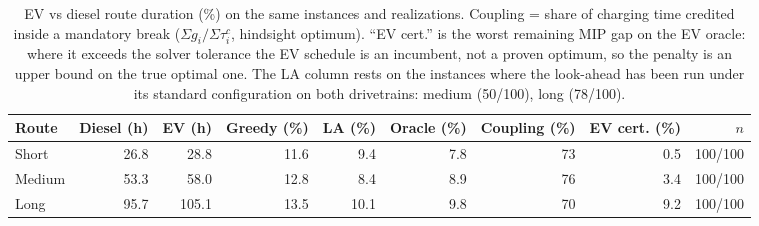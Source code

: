 \begin{table}[ht]\centering
\caption{EV vs diesel route duration (\%) on the same instances and realizations.  Coupling = share of charging time credited inside a mandatory break ($\Sigma g_i/\Sigma\tau^c_i$, hindsight optimum). ``EV cert.'' is the worst remaining MIP gap on the EV oracle: where it exceeds the solver tolerance the EV schedule is an incumbent, not a proven optimum, so the penalty is an upper bound on the true optimal one.  The LA column rests on the instances where the look-ahead has been run under its standard configuration on both drivetrains: medium (50/100), long (78/100).}
\label{tab:diesel}
\begin{tabular}{lrrrrrrrr}
\hline
Route & Diesel (h) & EV (h) & Greedy (\%) & LA (\%) & Oracle (\%) & Coupling (\%) & EV cert. (\%) & $n$ \\
\hline
Short & 26.8 & 28.8 & 11.6 & 9.4 & 7.8 & 73 & 0.5 & 100/100 \\
Medium & 53.3 & 58.0 & 12.8 & 8.4 & 8.9 & 76 & 3.4 & 100/100 \\
Long & 95.7 & 105.1 & 13.5 & 10.1 & 9.8 & 70 & 9.2 & 100/100 \\
\hline
\end{tabular}
\end{table}
